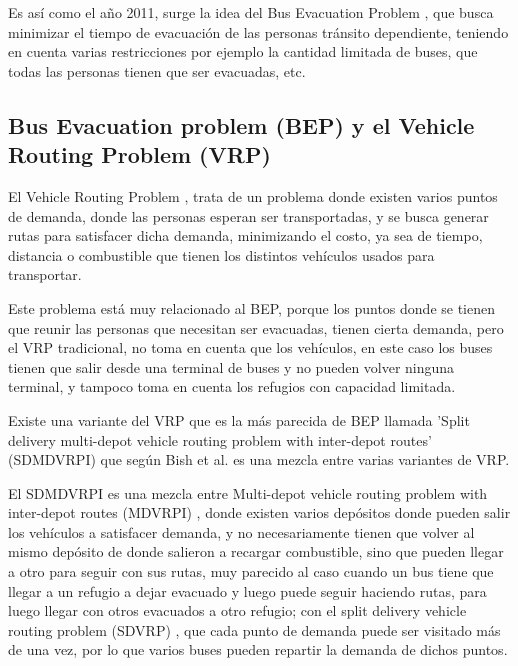 \documentclass[letter, 10pt]{article}
\begin{document}
Es así como el año 2011, surge la idea del Bus Evacuation Problem \cite{bish2011planning}, que busca minimizar el tiempo de evacuación de las personas tránsito dependiente, teniendo en cuenta varias restricciones por ejemplo la cantidad limitada de buses, que todas las personas tienen que ser evacuadas, etc.

\subsection{Bus Evacuation problem (BEP) y el Vehicle Routing Problem (VRP)}

El Vehicle Routing Problem \cite{toth2001vehicle}, trata de un problema donde existen varios puntos de demanda, donde las personas esperan ser transportadas, y se busca generar rutas para satisfacer dicha demanda, minimizando el costo, ya sea de tiempo, distancia o combustible que tienen los distintos vehículos usados para transportar.

Este problema está muy relacionado al BEP, porque los puntos donde se tienen que reunir las personas que necesitan ser evacuadas, tienen cierta demanda, pero el VRP tradicional, no toma en cuenta que los vehículos, en este caso los buses tienen que salir desde una terminal de buses y no pueden volver ninguna terminal, y tampoco toma en cuenta los refugios con capacidad limitada.

Existe una variante del VRP que es la más parecida de BEP llamada 'Split delivery multi-depot vehicle routing problem with inter-depot routes' (SDMDVRPI) que según Bish et al. \cite{bish2011planning} es una mezcla entre varias variantes de VRP.

El SDMDVRPI es una mezcla entre Multi-depot vehicle routing problem with inter-depot routes (MDVRPI) \cite{crevier2007multi}, donde existen varios depósitos donde pueden salir los vehículos a satisfacer demanda, y no necesariamente tienen que volver al mismo depósito  de donde salieron a recargar combustible, sino que pueden llegar a otro para seguir con sus rutas, muy parecido al caso cuando un bus tiene que llegar a un refugio a dejar evacuado y luego puede seguir haciendo rutas, para luego llegar con otros evacuados a otro refugio; con el split delivery vehicle routing problem (SDVRP) \cite{golden2008vehicle}, que cada punto de demanda puede ser visitado más de una vez, por lo que varios buses pueden repartir la demanda de dichos puntos.
\end{document}
